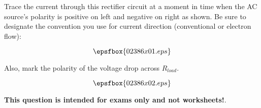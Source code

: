 

Trace the current through this rectifier circuit at a moment in time when the AC source's polarity is positive on left and negative on right as shown.  Be sure to designate the convention you use for current direction (conventional or electron flow):

$$\epsfbox{02386x01.eps}$$

Also, mark the polarity of the voltage drop across $R_{load}$.







$$\epsfbox{02386x02.eps}$$







{\bf This question is intended for exams only and not worksheets!}.




